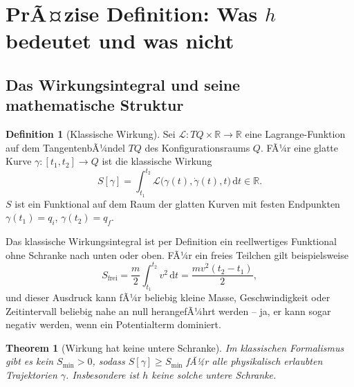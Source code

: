﻿\documentclass[12pt,a4paper]{article}
\theoremstyle{plain}
\newtheorem{theorem}{Theorem}[section]
\theoremstyle{definition}
\newtheorem{definition}{Definition}[section]
\theoremstyle{remark}
\newcommand{\Lagr}{\mathcal{L}}
\begin{document}
\section{PrÃ¤zise Definition: Was $h$ bedeutet und was nicht}

\subsection{Das Wirkungsintegral und seine mathematische Struktur}

\begin{definition}[Klassische Wirkung]\label{def:action}
  Sei $\Lagr: TQ \times \mathbb{R} \to \mathbb{R}$ eine Lagrange-Funktion auf dem
  TangentenbÃ¼ndel $TQ$ des Konfigurationsraums $Q$. FÃ¼r eine glatte Kurve
  $\gamma: [t_1, t_2] \to Q$ ist die klassische Wirkung
  \begin{equation}
    S[\gamma] = \int_{t_1}^{t_2} \Lagr\!\bigl(\gamma(t), \dot{\gamma}(t), t\bigr)\,\mathrm{d}t
    \in \mathbb{R}.
    \label{eq:wirkung_def}
  \end{equation}
  $S$ ist ein Funktional auf dem Raum der glatten Kurven mit festen Endpunkten
  $\gamma(t_1) = q_i$, $\gamma(t_2) = q_f$.
\end{definition}

Das klassische Wirkungsintegral ist per Definition ein reellwertiges Funktional ohne
Schranke nach unten oder oben. FÃ¼r ein freies Teilchen gilt beispielsweise
\begin{equation}
  S_{\mathrm{frei}} = \frac{m}{2}\int_{t_1}^{t_2} v^2\,\mathrm{d}t = \frac{m v^2 (t_2-t_1)}{2},
\end{equation}
und dieser Ausdruck kann fÃ¼r beliebig kleine Masse, Geschwindigkeit oder Zeitintervall
beliebig nahe an null herangefÃ¼hrt werden -- ja, er kann sogar negativ werden, wenn
ein Potentialterm dominiert.

\begin{theorem}[Wirkung hat keine untere Schranke]\label{thm:kein_minimum}
  Im klassischen Formalismus gibt es kein $S_{\min} > 0$, sodass $S[\gamma] \geq S_{\min}$
  fÃ¼r alle physikalisch erlaubten Trajektorien $\gamma$. Insbesondere ist $h$ keine
  solche untere Schranke.
\end{theorem}
\end{document}
